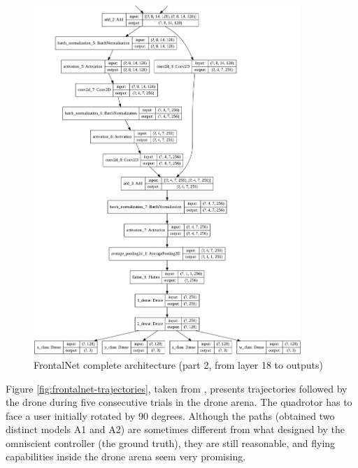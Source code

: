 \begin{figure}[!h]
	\centering
	\includegraphics[width=0.9\textwidth]{"contents/images/03-frontalnet-3B"}
	\caption[FrontalNet complete architecture (part 2, from layer 18 to outputs)]{FrontalNet complete architecture (part 2, from layer 18 to outputs)}
	\label{fig:frontalnet-architecture-3b}
\end{figure}

\clearpage

Figure \ref{fig:frontalnet-trajectories}, taken from \cite{mantegazza2019visionbased}, presents trajectories followed by the drone during five consecutive trials in the drone arena. The quadrotor has to face a user initially rotated by 90 degrees. Although the paths (obtained two distinct models A1 and A2) are sometimes different from what designed by the omniscient controller (the ground truth), they are still reasonable, and flying capabilities inside the drone arena seem very promising.

